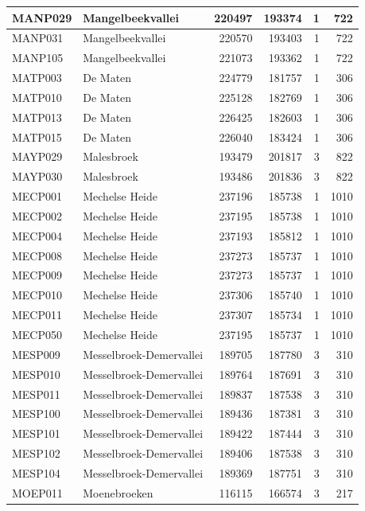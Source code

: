\documentclass[11pt,]{book}
\begin{document}
\begin{table}
\begin{tabular}[t]{l|l|r|r|r|r}
\hline
MANP029 & Mangelbeekvallei & 220497 & 193374 & 1 & 722\\
\hline
MANP031 & Mangelbeekvallei & 220570 & 193403 & 1 & 722\\
\hline
MANP105 & Mangelbeekvallei & 221073 & 193362 & 1 & 722\\
\hline
MATP003 & De Maten & 224779 & 181757 & 1 & 306\\
\hline
MATP010 & De Maten & 225128 & 182769 & 1 & 306\\
\hline
MATP013 & De Maten & 226425 & 182603 & 1 & 306\\
\hline
MATP015 & De Maten & 226040 & 183424 & 1 & 306\\
\hline
MAYP029 & Malesbroek & 193479 & 201817 & 3 & 822\\
\hline
MAYP030 & Malesbroek & 193486 & 201836 & 3 & 822\\
\hline
MECP001 & Mechelse Heide & 237196 & 185738 & 1 & 1010\\
\hline
MECP002 & Mechelse Heide & 237195 & 185738 & 1 & 1010\\
\hline
MECP004 & Mechelse Heide & 237193 & 185812 & 1 & 1010\\
\hline
MECP008 & Mechelse Heide & 237273 & 185737 & 1 & 1010\\
\hline
MECP009 & Mechelse Heide & 237273 & 185737 & 1 & 1010\\
\hline
MECP010 & Mechelse Heide & 237306 & 185740 & 1 & 1010\\
\hline
MECP011 & Mechelse Heide & 237307 & 185734 & 1 & 1010\\
\hline
MECP050 & Mechelse Heide & 237195 & 185737 & 1 & 1010\\
\hline
MESP009 & Messelbroek-Demervallei & 189705 & 187780 & 3 & 310\\
\hline
MESP010 & Messelbroek-Demervallei & 189764 & 187691 & 3 & 310\\
\hline
MESP011 & Messelbroek-Demervallei & 189837 & 187538 & 3 & 310\\
\hline
MESP100 & Messelbroek-Demervallei & 189436 & 187381 & 3 & 310\\
\hline
MESP101 & Messelbroek-Demervallei & 189422 & 187444 & 3 & 310\\
\hline
MESP102 & Messelbroek-Demervallei & 189406 & 187538 & 3 & 310\\
\hline
MESP104 & Messelbroek-Demervallei & 189369 & 187751 & 3 & 310\\
\hline
MOEP011 & Moenebroeken & 116115 & 166574 & 3 & 217\\
\hline

\end{tabular}
\end{table}
\end{document}
